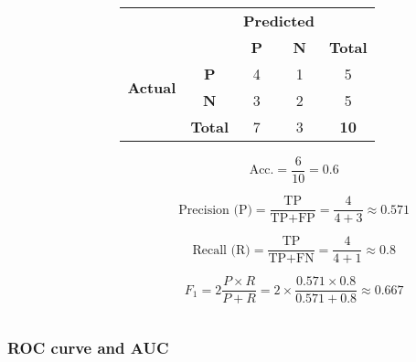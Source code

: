 \documentclass[aspectratio=169, 10pt]{beamer}
\begin{document}
\begin{frame}
\begin{columns}
\begin{column}{0.5\textwidth}
        \end{column}
        \begin{column}{0.5\textwidth}
            \begin{table}[]
                \begin{tabular}{ccccc}
                \textbf{}                        & \textbf{}                       & \multicolumn{2}{c}{\textbf{Predicted}}          &                \\
                                                 &                                 & \textbf{P}             & \textbf{N}             & \textbf{Total} \\ \cline{3-4}
                \multirow{2}{*}{\textbf{Actual}} & \multicolumn{1}{c|}{\textbf{P}} & \multicolumn{1}{c|}{4} & \multicolumn{1}{c|}{1} & 5              \\ \cline{3-4}
                                                 & \multicolumn{1}{c|}{\textbf{N}} & \multicolumn{1}{c|}{3} & \multicolumn{1}{c|}{2} & 5              \\ \cline{3-4}
                                                 & \textbf{Total}                  & 7                      & 3                      & \textbf{10}   
                \end{tabular}
            \end{table}
            
            \[
                \text{Acc.} = \frac{6}{10} = 0.6
            \]

            \[
                \text{Precision (P)} = \frac{\text{TP}}{\text{TP}+ \text{FP}} = \frac{4}{4+3} \approx 0.571
            \]

            \[
                \text{Recall (R)} = \frac{\text{TP}}{\text{TP}+ \text{FN}} = \frac{4}{4+1} \approx 0.8
            \]

            \[
                F_1 = 2 \frac{P \times R}{P + R} = 2 \times \frac{0.571 \times 0.8}{0.571 + 0.8} \approx 0.667
            \]

        \end{column}
    \end{columns}

\end{frame}

\begin{frame}
    \frametitle{ROC curve and AUC}
    
    
\end{frame}
\end{document}

